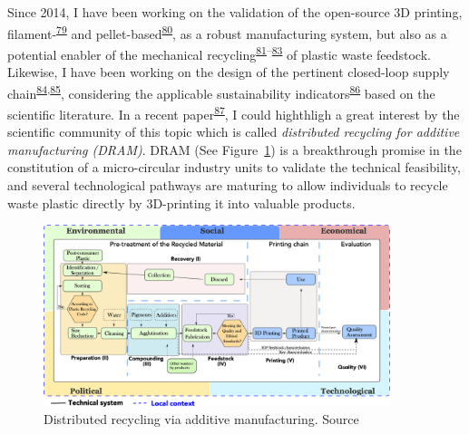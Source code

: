 \documentclass[
  12pt,
  a4paperpaper,
  onecolumn]{article}
\begin{document}
Since 2014, I have been working on the validation of the open-source 3D
printing,
filament-\textsuperscript{\protect\hyperlink{ref-CruzSanchez2014}{79}}
and
pellet-based\textsuperscript{\protect\hyperlink{ref-Arthur2020}{80}}, as
a robust manufacturing system, but also as a potential enabler of the
mechanical
recycling\textsuperscript{\protect\hyperlink{ref-Cruz2015}{81}--\protect\hyperlink{ref-lopez2022}{83}}
of plastic waste feedstock. Likewise, I have been working on the design
of the pertinent closed-loop supply
chain\textsuperscript{\protect\hyperlink{ref-Pavlo2018}{84},\protect\hyperlink{ref-Santander2020}{85}},
considering the applicable sustainability
indicators\textsuperscript{\protect\hyperlink{ref-Santander2022}{86}}
based on the scientific literature. In a recent
paper\textsuperscript{\protect\hyperlink{ref-CruzSanchez2020}{87}}, I
could highthligh a great interest by the scientific community of this
topic which is called \emph{distributed recycling for additive
manufacturing (DRAM)}. DRAM (See Figure~\ref{fig-DRAM}) is a
breakthrough promise in the constitution of a micro-circular industry
units to validate the technical feasibility, and several technological
pathways are maturing to allow individuals to recycle waste plastic
directly by 3D-printing it into valuable products.

\begin{figure}

{\centering \includegraphics[width=0.9\textwidth,height=\textheight]{Figures/SDRAM-00.png}

}

\caption{\label{fig-DRAM}Distributed recycling via additive
manufacturing. Source}

\end{figure}
\end{document}
